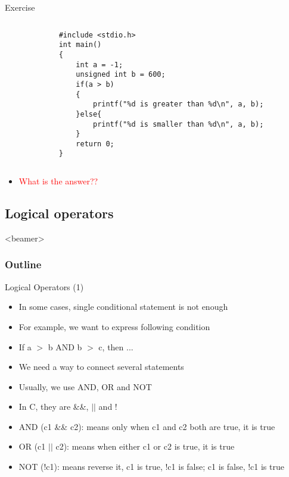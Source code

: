 \begin{frame}[fragile]{Exercise}
\vspace{-0.3in}
	\begin{columns}
		\begin{column}{0.1\linewidth}
		\end{column}
		\begin{column}{0.9\linewidth}
	\begin{lstlisting}[linewidth=0.9\textwidth]
#include <stdio.h>
int main()
{
    int a = -1;
    unsigned int b = 600;
    if(a > b)
    {
        printf("%d is greater than %d\n", a, b);
    }else{
        printf("%d is smaller than %d\n", a, b);
    }
    return 0;
}
	\end{lstlisting}
	\end{column}
\end{columns}
\begin{itemize}
	\item {\textcolor{red}{What is the answer??}}
\end{itemize}
\end{frame}

\subsection{Logical operators}
\begin{frame}<beamer>
    \frametitle{Outline}
\end{frame}

\begin{frame}[fragile]{Logical Operators (1)}
\begin{itemize}
	\item {In some cases, single conditional statement is not enough}
	\item {For example, we want to express following condition}
	\item {If a $>$ b AND b $>$ c, then ...}
	\item {We need a way to connect several statements}
	\item {Usually, we use AND, OR and NOT}
	\item {In C, they are \&\&, $||$ and !}
\end{itemize}

\begin{itemize}
	\item {AND (c1 \&\& c2): means only when c1 and c2 both are true,  it is true}
	\item {OR (c1 $||$ c2): means when either c1 or c2 is true,  it is true}
	\item {NOT (!c1): means reverse it, c1 is true, !c1 is false; c1 is false, !c1 is true}
\end{itemize}

\end{frame}

